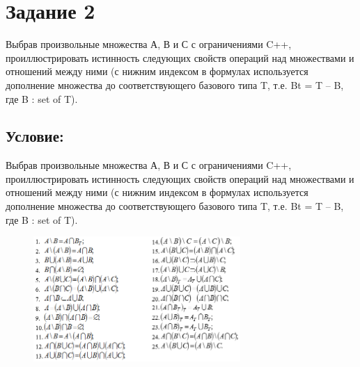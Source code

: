 \documentclass[14pt,a4paper]{article}
\begin{document}
\section*{Задание 2}
Выбрав произвольные множества А, В и С с ограничениями C++, проиллюстрировать
истинность следующих свойств операций над множествами и отношений между ними (с
нижним индексом в формулах используется дополнение множества до
соответствующего базового типа T, т.е. Bt = T – B, где B : set of T).
\setcounter{subsection}{0}
\subsection{Условие:}
Выбрав произвольные множества А, В и С с ограничениями C++, проиллюстрировать
истинность следующих свойств операций над множествами и отношений между ними (с
нижним индексом в формулах используется дополнение множества до
соответствующего базового типа T, т.е. Bt = T – B, где B : set of T).
\begin{figure}[H]
  \centering
  \includegraphics[width=0.7\textwidth]{data/condition19_2.png}
\end{figure}
\end{document}
